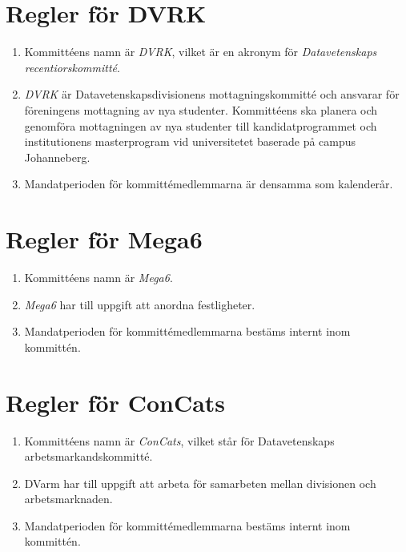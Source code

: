 \documentclass{dvd}
\begin{document}
\section{Regler för DVRK}

	\begin{enumerate}[label=\arabic* §, ref=\arabic*]
		\item Kommittéens namn är \emph{DVRK}, vilket är en akronym för \emph{Datavetenskaps recentiorskommitté}.

		\item \emph{DVRK} är Datavetenskapsdivisionens mottagningskommitté och ansvarar för föreningens mottagning av nya studenter.
		Kommittéens ska planera och genomföra mottagningen av nya studenter till kandidatprogrammet och institutionens masterprogram vid universitetet baserade på campus Johanneberg.

		\item Mandatperioden för kommittémedlemmarna är densamma som kalenderår.

	\end{enumerate}

\section{Regler för Mega6}

	\begin{enumerate}[label=\arabic* §, ref=\arabic*]
		\item Kommittéens namn är \emph{Mega6}.

		\item \emph{Mega6} har till uppgift att anordna festligheter.

		\item Mandatperioden för kommittémedlemmarna bestäms internt inom kommittén.

	\end{enumerate}

\section{Regler för ConCats}

	\begin{enumerate}[label=\arabic* §, ref=\arabic*]
		\item Kommittéens namn är \emph{ConCats}, vilket står för Datavetenskaps arbetsmarkandskommitté.

		\item DVarm har till uppgift att arbeta för samarbeten mellan divisionen och arbetsmarknaden.

		\item Mandatperioden för kommittémedlemmarna bestäms internt inom kommittén.

	\end{enumerate}
\end{document}
